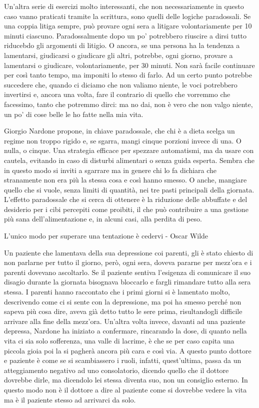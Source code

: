 \documentclass[12pt]{book} %
\begin{document}
\begin{mdframed}[linewidth=1pt]
Un'altra serie di esercizi molto interessanti, che non necessariamente in questo caso vanno
praticati tramite la scrittura, sono quelli delle logiche paradossali. Se una coppia litiga sempre, può provare ogni sera a litigare volontariamente per 10 minuti ciascuno.
Paradossalmente dopo un po' potrebbero riuscire a dirsi tutto riducebdo gli argomenti di litigio. O ancora, se una
persona ha la tendenza a lamentarsi, giudicarsi o giudicare gli altri, potrebbe, ogni giorno, provare a lamentarsi o
giudicare, volontariamente, per 30 minuti. Non sarà facile continuare per così tanto tempo, ma imponiti lo stesso di
farlo. Ad un certo punto potrebbe succedere che, quando ci diciamo che non valiamo niente, le voci potrebbero invertirsi e, ancora una volta, fare il contrario di quello che vorremmo che facessimo, tanto che potremmo dirci: ma no dai, non è vero che non valgo niente, un po' di cose belle le ho fatte nella mia vita.

Giorgio Nardone propone, in chiave paradossale, che chi è a dieta scelga un regime non troppo rigido e, se sgarra, mangi cinque porzioni invece di una. O nulla, o cinque. Una strategia efficace per spezzare automatismi, ma da usare con cautela, evitando in caso di disturbi alimentari o senza guida esperta. Sembra che in questo modo si inviti a sgarrare ma in genere chi lo fa
dichiara che stranamente non era più la stessa cosa e così hanno smesso. O anche, mangiare quello che si vuole, senza
limiti di quantità, nei tre pasti principali della giornata. L'effetto paradossale che si cerca di ottenere è la riduzione delle abbuffate e del desiderio per i cibi percepiti come proibiti, il che può contribuire a una gestione più sana dell'alimentazione e, in alcuni casi, alla perdita di peso.

L'unico modo per superare una tentazione è cedervi - Oscar Wilde

Un paziente che lamentava della sua depressione coi parenti, gli è stato chiesto di non parlarne per tutto il giorno,
però, ogni sera, doveva pararne per mezz'ora e i parenti dovevano ascoltarlo. Se il paziente
sentiva l'esigenza di comunicare il suo disagio durante la giornata bisognava bloccarlo e fargli
rimandare tutto alla sera stessa. I parenti hanno raccontato che i primi giorni si è lamentato molto, descrivendo come
ci si sente con la depressione, ma poi ha smesso perché non sapeva più cosa dire, aveva già detto tutto le sere prima,
risultandogli difficile arrivare alla fine della mezz'ora. Un'altra volta
invece, davanti ad una paziente depressa, Nardone ha iniziato a confermare, rincarando la dose, di quanto nella vita ci
sia solo sofferenza, una valle di lacrime, è che se per caso capita una piccola gioia poi la si pagherà ancora più cara
e così via. A questo punto dottore e paziente è come se si scambiassero i ruoli, infatti,
quest'ultima, passa da un atteggiamento negativo ad uno consolatorio, dicendo quello che il
dottore dovrebbe dirle, ma dicendolo lei stessa diventa suo, non un consiglio esterno. In questo modo non è il dottore
a dire al paziente come si dovrebbe vedere la vita ma è il paziente stesso ad arrivarci da solo.


\end{mdframed}
\end{document}
